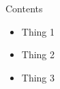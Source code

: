 \begin{frame}[c]{Contents}

	\begin{itemize}
		\item Thing 1
    \item Thing 2
    \item Thing 3
	\end{itemize}

\end{frame}
